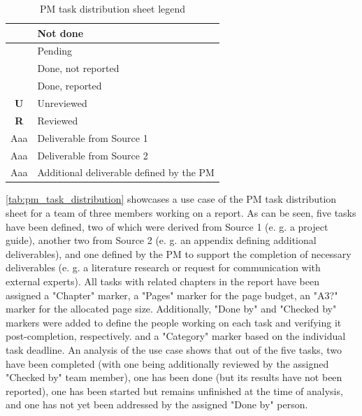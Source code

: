 \begin{table}
\centering
\small
\caption{PM task distribution sheet legend}
\begin{tabular}{|c|p{4.3cm}|}
\hline
\cellcolor{red!50} & Not done \\\hline
\cellcolor{orange!50} & Pending \\\hline
\cellcolor{yellow!50} & Done, not reported \\\hline
\cellcolor{green!50} & Done, reported \\\hline
\textbf{U} & Unreviewed \\\hline
\textbf{R} & Reviewed \\\hline
{\color{red}Aaa} & Deliverable from Source 1\\\hline
{\color{blue}Aaa} & Deliverable from Source 2 \\\hline
{\color{black}Aaa} & Additional deliverable defined by the PM \\\hline
\end{tabular}

\label{tab:pm_task_distribution_legend}
\end{table}


\autoref{tab:pm_task_distribution} showcases a use case of the PM task distribution sheet for a team of three members working on a report. As can be seen, five tasks have been defined, two of which were derived from Source 1 (e. g. a project guide), another two from Source 2 (e. g. an appendix defining additional deliverables), and one defined by the PM to support the completion of necessary deliverables (e. g. a literature research or request for communication with external experts). All tasks with related chapters in the report have been assigned a "Chapter" marker, a "Pages" marker for the page budget, an "A3?" marker for the allocated page size. Additionally, "Done by" and "Checked by" markers were added to define the people working on each task and verifying it post-completion, respectively. and a "Category" marker based on the individual task deadline. An analysis of the use case shows that out of the five tasks, two have been completed (with one being additionally reviewed by the assigned "Checked by" team member), one has been done (but its results have not been reported), one has been started but remains unfinished at the time of analysis, and one has not yet been addressed by the assigned "Done by" person.


